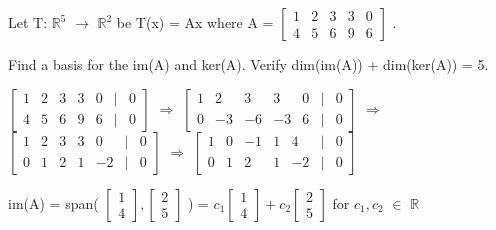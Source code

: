     \begin{example}
        Let T: $\mathbb{R}^5$ $\rightarrow$ $\mathbb{R}^2$
        be T(x) = Ax where A =
        \scriptsize
        $\begin{bmatrix}
            1 & 2 & 3 & 3 & 0 \\
            4 & 5 & 6 & 9 & 6
        \end{bmatrix}$
        \normalsize.

        Find a basis for the im(A) and ker(A).
        Verify dim(im(A)) + dim(ker(A)) = 5.
    \end{example}

    \begin{tbox}
        \scriptsize
        $\begin{bmatrix}
            1 & 2 & 3 & 3 & 0 & | & 0 \\
            4 & 5 & 6 & 9 & 6 & | & 0
        \end{bmatrix}$
        $\Rightarrow$
        $\begin{bmatrix}
            1 & 2 & 3 & 3 & 0 & | & 0 \\
            0 & -3 & -6 & -3 & 6 & | & 0
        \end{bmatrix}$
        $\Rightarrow$
        $\begin{bmatrix}
            1 & 2 & 3 & 3 & 0 & | & 0 \\
            0 & 1 & 2 & 1 & -2 & | & 0
        \end{bmatrix}$
        $\Rightarrow$
        $\begin{bmatrix}
            1 & 0 & -1 & 1 & 4 & | & 0 \\
            0 & 1 & 2 & 1 & -2 & | & 0
        \end{bmatrix}$
        \normalsize

        \hspace{0.5cm}
        im(A) = span(
        \scriptsize
        $\begin{bmatrix}
            1 \\
            4 
        \end{bmatrix},
        \begin{bmatrix}
            2 \\
            5 
        \end{bmatrix}$
        \normalsize) =
        \scriptsize
        $c_1\begin{bmatrix}
            1 \\
            4 
        \end{bmatrix} +
        c_2\begin{bmatrix}
            2 \\
            5 
        \end{bmatrix}$
        \normalsize
        for $c_1,c_2$ $\in$ $\mathbb{R}$


\end{tbox}
